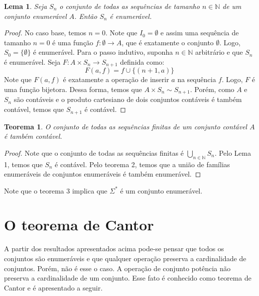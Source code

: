 \documentclass[a4paper]{article}
\newtheorem{Lemma}{Lema}
\newtheorem{Theorem}{Teorema}
\theoremstyle{definition}
\begin{document}
  \begin{Lemma}
    Seja $S_n$ o conjunto de todas as sequências de tamanho $n\in\mathbb{N}$ de
    um conjunto enumerável $A$. Então $S_n$ é enumerável.
  \end{Lemma}
  \begin{proof}
    No caso base, temos $n = 0$. Note que $I_0 = \emptyset$ e assim uma
    sequência de tamanho $n = 0$ é uma função $f : \emptyset \to A$, que
    é exatamente o conjunto $\emptyset$. Logo, $S_0 = \{\emptyset\}$ é
    enumerável. Para o passo indutivo, suponha $n\in\mathbb{N}$ arbitrário e que
    $S_n$ é enumerável. Seja $F : A \times S_n \to S_{n + 1}$ definida como:
    \[
      F(a,f) = f \cup \{(n+1,a)\}
    \]
    Note que $F(a,f)$ é exatamente a operação de inserir $a$ na sequência $f$.
    Logo, $F$ é uma função bijetora. Dessa forma, temos que $A \times S_n \sim
    S_{n + 1}$. Porém, como $A$ e $S_n$ são contáveis e o produto cartesiano de
    dois conjuntos contáveis é também contável, temos que $S_{n + 1}$ é contável.
  \end{proof}

  \begin{Theorem}
    O conjunto de todas as sequências finitas de um conjunto contável $A$ é
    também contável.
  \end{Theorem}
  \begin{proof}
    Note que o conjunto de todas as sequências finitas é
    $\bigcup_{n\in\mathbb{N}}S_n$. Pelo Lema 1, temos que $S_n$ é contável. Pelo
    teorema 2, temos que a união de famílias enumeráveis de conjuntos
    enumeráveis é também enumerável.
  \end{proof}

  Note que o teorema 3 implica que $\Sigma^*$ é um conjunto enumerável.

  \section{O teorema de Cantor}

  A partir dos resultados apresentados acima pode-se pensar que todos os
  conjuntos são enumeráveis e que qualquer operação preserva a cardinalidade
  de conjuntos. Porém, não é esse o caso. A operação de conjunto potência não
  preserva a cardinalidade de um conjunto. Esse fato é conhecido como teorema
  de Cantor e é apresentado a seguir.
\end{document}

